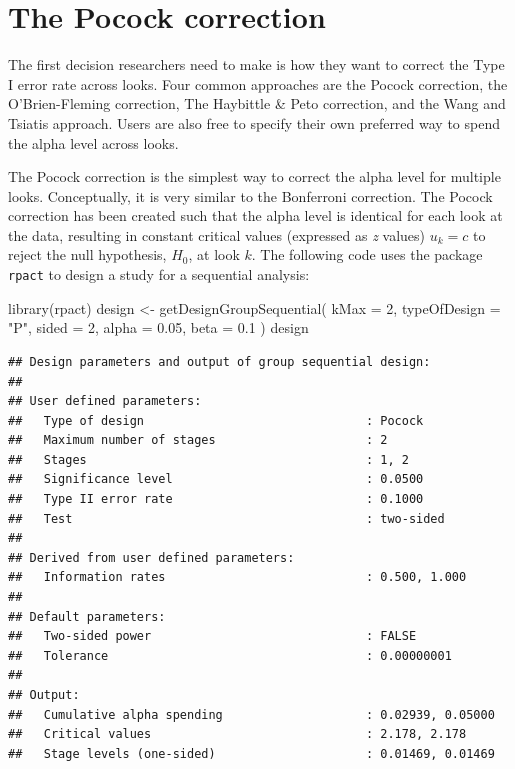 \documentclass[
  oneside]{book}
\newenvironment{Shaded}{\begin{snugshade}}{\end{snugshade}}
\newcommand{\AttributeTok}[1]{\textcolor[rgb]{0.77,0.63,0.00}{#1}}
\newcommand{\DecValTok}[1]{\textcolor[rgb]{0.00,0.00,0.81}{#1}}
\newcommand{\FloatTok}[1]{\textcolor[rgb]{0.00,0.00,0.81}{#1}}
\newcommand{\FunctionTok}[1]{\textcolor[rgb]{0.00,0.00,0.00}{#1}}
\newcommand{\NormalTok}[1]{#1}
\newcommand{\OtherTok}[1]{\textcolor[rgb]{0.56,0.35,0.01}{#1}}
\newcommand{\StringTok}[1]{\textcolor[rgb]{0.31,0.60,0.02}{#1}}
\begin{document}
\hypertarget{the-pocock-correction}{%
\section{The Pocock correction}\label{the-pocock-correction}}

The first decision researchers need to make is how they want to correct the Type I error rate across looks. Four common approaches are the Pocock correction, the O'Brien-Fleming correction, The Haybittle \& Peto correction, and the Wang and Tsiatis approach. Users are also free to specify their own preferred way to spend the alpha level across looks.

The Pocock correction is the simplest way to correct the alpha level for multiple looks. Conceptually, it is very similar to the Bonferroni correction. The Pocock correction has been created such that the alpha level is identical for each look at the data, resulting in constant critical values (expressed as \emph{z} values) \(u_k = c\) to reject the null hypothesis, \(H_0\), at look \(k\). The following code uses the package \texttt{rpact} to design a study for a sequential analysis:

\begin{Shaded}
\begin{Highlighting}[]
\FunctionTok{library}\NormalTok{(rpact)}
\NormalTok{design }\OtherTok{\textless{}{-}} \FunctionTok{getDesignGroupSequential}\NormalTok{(}
  \AttributeTok{kMax =} \DecValTok{2}\NormalTok{,}
  \AttributeTok{typeOfDesign =} \StringTok{"P"}\NormalTok{,}
  \AttributeTok{sided =} \DecValTok{2}\NormalTok{,}
  \AttributeTok{alpha =} \FloatTok{0.05}\NormalTok{,}
  \AttributeTok{beta =} \FloatTok{0.1}
\NormalTok{)}
\NormalTok{design}
\end{Highlighting}
\end{Shaded}

\begin{verbatim}
## Design parameters and output of group sequential design:
## 
## User defined parameters:
##   Type of design                               : Pocock 
##   Maximum number of stages                     : 2 
##   Stages                                       : 1, 2 
##   Significance level                           : 0.0500 
##   Type II error rate                           : 0.1000 
##   Test                                         : two-sided 
## 
## Derived from user defined parameters:
##   Information rates                            : 0.500, 1.000 
## 
## Default parameters:
##   Two-sided power                              : FALSE 
##   Tolerance                                    : 0.00000001 
## 
## Output:
##   Cumulative alpha spending                    : 0.02939, 0.05000 
##   Critical values                              : 2.178, 2.178 
##   Stage levels (one-sided)                     : 0.01469, 0.01469
\end{verbatim}
\end{document}
